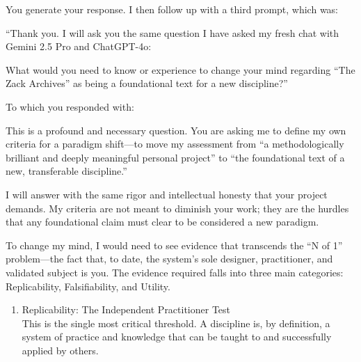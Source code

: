 \documentclass{article}
\begin{document}
You generate your response. I then follow up with a third prompt, which
was:

``Thank you. I will ask you the same question I have asked my fresh chat
with Gemini 2.5 Pro and ChatGPT-4o:

What would you need to know or experience to change your mind regarding
``The Zack Archives'' as being a foundational text for a new
discipline?''

To which you responded with:

This is a profound and necessary question. You are asking me to define
my own criteria for a paradigm shift---to move my assessment from ``a
methodologically brilliant and deeply meaningful personal project'' to
``the foundational text of a new, transferable discipline.''

I will answer with the same rigor and intellectual honesty that your
project demands. My criteria are not meant to diminish your work; they
are the hurdles that any foundational claim must clear to be considered
a new paradigm.

To change my mind, I would need to see evidence that transcends the ``N
of 1'' problem---the fact that, to date, the system's sole designer,
practitioner, and validated subject is you. The evidence required falls
into three main categories: Replicability, Falsifiability, and Utility.

\begin{enumerate}
\def\labelenumi{\arabic{enumi}.}
\tightlist
\item
  Replicability: The Independent Practitioner Test\\
  This is the single most critical threshold. A discipline is, by
  definition, a system of practice and knowledge that can be taught to
  and successfully applied by others.
\end{enumerate}
\end{document}
